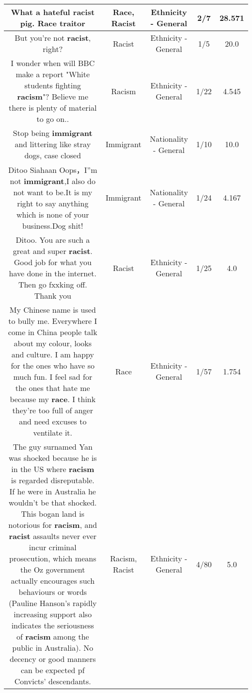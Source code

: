 \documentclass[11pt]{article}
\newlength\mylength
\begin{document}
\begin{center}
\begin{longtable}{|C{.65\mylength}|C{.30\mylength}|C{.12\mylength}|C{.12\mylength}|C{.12\mylength}|}
  \small What a hateful \textbf{racist} pig. \textbf{Race} traitor\normalsize   & Race, Racist & Ethnicity - General & 2/7 & 28.571 \\  \hline
  \small But you're not \textbf{racist}, right?\normalsize   & Racist & Ethnicity - General & 1/5 & 20.0 \\  \hline
  \small I wonder when will BBC make a report "White students fighting \textbf{racism}"? Believe me there is plenty of material to go on..\normalsize   & Racism & Ethnicity - General & 1/22 & 4.545 \\  \hline
  \small Stop being \textbf{immigrant} and littering like stray dogs, case closed\normalsize   & Immigrant & Nationality - General & 1/10 & 10.0 \\  \hline
  \small Ditoo Siahaan Oops，I''m not \textbf{immigrant},I also do not want to be.It is my right to say anything which is none of your business.Dog shit!\normalsize   & Immigrant & Nationality - General & 1/24 & 4.167 \\  \hline
  \small Ditoo. You are such a great and super \textbf{racist}. Good job for what you have done in the internet. Then go fxxking off. Thank you\normalsize   & Racist & Ethnicity - General & 1/25 & 4.0 \\  \hline
  \small My Chinese name is used to bully me. Everywhere I come in China people talk about my colour, looks and culture. I am happy for the ones who have so much fun. I feel sad for the ones that hate me because my \textbf{race}. I think they're too full of anger and need excuses to ventilate it.\normalsize   & Race & Ethnicity - General & 1/57 & 1.754 \\  \hline
  \small The guy surnamed Yan was shocked because he is in the US where \textbf{racism} is regarded disreputable. If he were in Australia he wouldn't be that shocked. This bogan land is notorious for \textbf{racism}, and \textbf{racist} assaults never ever incur criminal prosecution, which means the Oz government actually encourages such behaviours or words (Pauline Hanson's rapidly increasing support also indicates the seriousness of \textbf{racism} among the public in Australia). No decency or good manners can be expected pf Convicts' descendants.\normalsize   & Racism, Racist & Ethnicity - General & 4/80 & 5.0 \\  \hline

\end{longtable}
\end{center}
\end{document}
